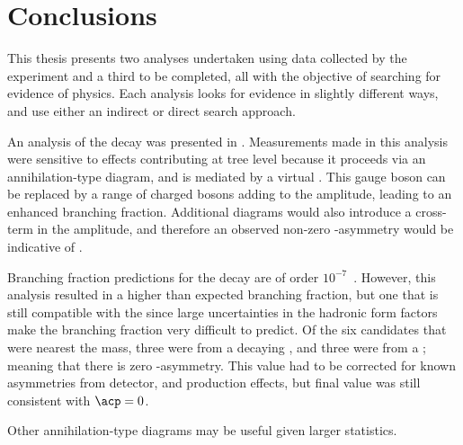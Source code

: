 \chapter{Conclusions}
\label{ch:conc}


This thesis presents two analyses undertaken using data collected by the \lhcb experiment
and a third to be completed, all
with the objective of searching for evidence of \bsm physics.
Each analysis looks for evidence in slightly different ways, and use either an indirect or direct
search approach.

An analysis of the decay \btodsphi was presented in .
Measurements made in this analysis were sensitive to \np effects contributing at tree
level because it proceeds via an annihilation-type diagram, and is mediated by a virtual \Wp.
This gauge boson can be replaced by a range of charged bosons adding to the amplitude, leading to
an enhanced branching fraction.
Additional \np diagrams would also introduce a cross-term in the amplitude, and therefore an
observed non-zero \CP-asymmetry would be indicative of \np.

Branching fraction predictions for the decay \btodsphi are of order
$10^{-7}$~\cite{Zou:2009zza,Mohanta:2002wf,PhysRevD.76.057701,Lu:2001yz}.
However, this analysis resulted in a higher than expected branching fraction, but one that is
still compatible with the \sm since large uncertainties in the hadronic form factors make the
branching fraction very difficult to predict.
Of the six candidates that were nearest the \Bp mass, three were from a decaying \Bp, and three
were from a \Bm; meaning that there is zero \CP-asymmetry.
This value had to be corrected for known asymmetries from detector, and production effects, but
final value was still consistent with $\acp=0$.

Other annihilation-type diagrams may be useful given larger statistics.

